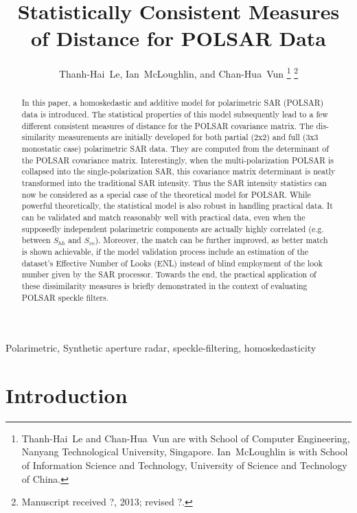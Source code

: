 \documentclass[journal]{IEEEtran}
\title{
  Statistically Consistent Measures of Distance for POLSAR Data
}
\author{Thanh-Hai~Le,
        Ian~McLoughlin, 
	and Chan-Hua~Vun%
\thanks{Thanh-Hai~Le and Chan-Hua~Vun are with School of Computer Engineering, 
Nanyang Technological University, Singapore. Ian~McLoughlin is with School of Information Science and Technology,
University of Science and Technology of China.
}%
\thanks{Manuscript received ?, 2013; revised ?.}}
\begin{document}
\maketitle

\begin{abstract}
In this paper, a homoskedastic and additive model for polarimetric SAR (POLSAR) data is introduced. 
The statistical properties of this model subsequently lead to a few different consistent measures of distance for the POLSAR covariance matrix.
The dis-similarity measurements are initially developed for both partial (2x2) and full (3x3 monostatic case) polarimetric SAR data.
They are computed from the determinant of the POLSAR covariance matrix.
Interestingly, when the multi-polarization POLSAR is collapsed into the single-polarization SAR,
  this covariance matrix determinant is neatly transformed into the traditional SAR intensity.
Thus the SAR intensity statistics can now be considered as a special case of the theoretical model for POLSAR.
While powerful theoretically, the statistical model is also robust in handling practical data.
It can be validated and match reasonably well with practical data,
 even  when  the supposedly independent polarimetric components are actually highly correlated (e.g. between $S_{hh}$ and $S_{vv}$).
Moreover, the match can be further improved, as better match is shown achievable, 
  if the model validation process include an estimation of the dataset's Effective Number of Looks (ENL) 
  instead of blind employment of the look number given by the SAR processor.
Towards the end, the practical application of these dissimilarity measures is briefly demonstrated in the context of evaluating POLSAR speckle filters.  
\end{abstract}

\begin{IEEEkeywords}
Polarimetric, Synthetic aperture radar, speckle-filtering, homoskedasticity
\end{IEEEkeywords}

\IEEEpeerreviewmaketitle

\section{Introduction}
\end{document}
